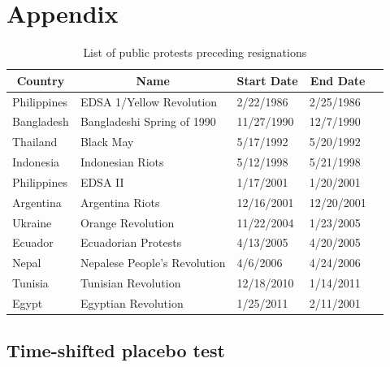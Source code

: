 \documentclass[12pt,final,fleqn]{article}
\theoremstyle{plain}
\begin{document}
\newpage

\appendix
\setcounter{table}{0}
\renewcommand\thetable{\Alph{section}.\arabic{table}}
\setcounter{figure}{0}
\renewcommand{\thefigure}{A\arabic{figure}}

\section{Appendix} \label{Appendix}
\begin{table}[!ht]
\caption{List of public protests preceding resignations} \label{tab:protest-list}
\vspace{-5pt}
\footnotesize
\begin{center}
\begin{threeparttable}
\begin{tabular*}{\textwidth}{l@{\extracolsep{\fill}}llll}
  \hline
    \hline
\multicolumn{1}{c}{Country}&\multicolumn{1}{c}{Name}&\multicolumn{1}{c}{Start Date}&\multicolumn{1}{c}{End Date}\\
  \hline
Philippines & EDSA 1/Yellow Revolution & 2/22/1986 & 2/25/1986\\
Bangladesh & Bangladeshi Spring of 1990 & 11/27/1990 & 12/7/1990\\
Thailand & Black May & 5/17/1992 & 5/20/1992\\
Indonesia & Indonesian Riots & 5/12/1998 & 5/21/1998\\
Philippines & EDSA II & 1/17/2001 & 1/20/2001\\
Argentina & Argentina Riots & 12/16/2001 & 12/20/2001\\
Ukraine & Orange Revolution & 11/22/2004 & 1/23/2005\\
Ecuador & Ecuadorian Protests & 4/13/2005 & 4/20/2005\\
Nepal & Nepalese People's Revolution & 4/6/2006 & 4/24/2006\\
Tunisia & Tunisian Revolution & 12/18/2010 & 1/14/2011\\
Egypt & Egyptian Revolution & 1/25/2011 & 2/11/2001\\
   \hline
   \hline
\end{tabular*}
\scriptsize
\end{threeparttable}
\end{center}
\end{table}

\pagebreak

\subsection{Time-shifted placebo test}
\end{document}
